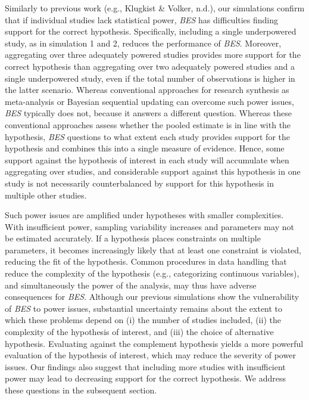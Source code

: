 \documentclass[
]{interact}
\begin{document}
Similarly to previous work (e.g., Klugkist \& Volker, n.d.), our
simulations confirm that if individual studies lack statistical power,
\emph{BES} has difficulties finding support for the correct hypothesis.
Specifically, including a single underpowered study, as in simulation 1
and 2, reduces the performance of \emph{BES}. Moreover, aggregating over
three adequately powered studies provides more support for the correct
hypothesis than aggregating over two adequately powered studies and a
single underpowered study, even if the total number of observations is
higher in the latter scenario. Whereas conventional approaches for
research synthesis as meta-analysis or Bayesian sequential updating can
overcome such power issues, \emph{BES} typically does not, because it
answers a different question. Whereas these conventional approaches
assess whether the pooled estimate is in line with the hypothesis,
\emph{BES} questions to what extent each study provides support for the
hypothesis and combines this into a single measure of evidence. Hence,
some support against the hypothesis of interest in each study will
accumulate when aggregating over studies, and considerable support
against this hypothesis in one study is not necessarily counterbalanced
by support for this hypothesis in multiple other studies.

Such power issues are amplified under hypotheses with smaller
complexities. With insufficient power, sampling variability increases
and parameters may not be estimated accurately. If a hypothesis places
constraints on multiple parameters, it becomes increasingly likely that
at least one constraint is violated, reducing the fit of the hypothesis.
Common procedures in data handling that reduce the complexity of the
hypothesis (e.g., categorizing continuous variables), and simultaneously
the power of the analysis, may thus have adverse consequences for
\emph{BES}. Although our previous simulations show the vulnerability of
\emph{BES} to power issues, substantial uncertainty remains about the
extent to which these problems depend on (i) the number of studies
included, (ii) the complexity of the hypothesis of interest, and (iii)
the choice of alternative hypothesis. Evaluating against the complement
hypothesis yields a more powerful evaluation of the hypothesis of
interest, which may reduce the severity of power issues. Our findings
also suggest that including more studies with insufficient power may
lead to decreasing support for the correct hypothesis. We address these
questions in the subsequent section.
\end{document}
